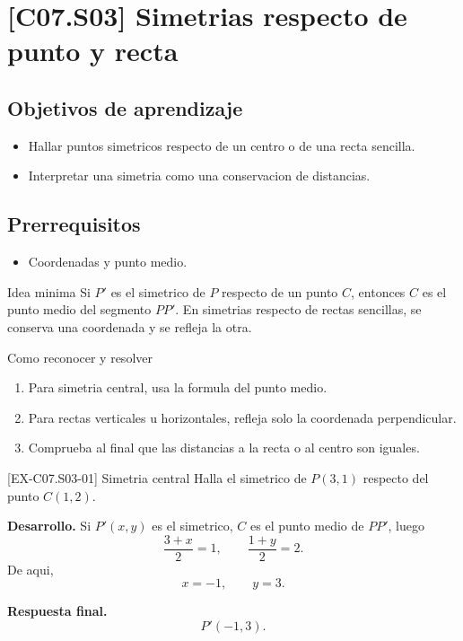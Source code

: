 \section{[C07.S03] Simetrias respecto de punto y recta}

\subsection*{Objetivos de aprendizaje}
\begin{itemize}
  \item Hallar puntos simetricos respecto de un centro o de una recta sencilla.
  \item Interpretar una simetria como una conservacion de distancias.
\end{itemize}

\subsection*{Prerrequisitos}
\begin{itemize}
  \item Coordenadas y punto medio.
\end{itemize}

\begin{theorybox}{Idea minima}
Si \(P'\) es el simetrico de \(P\) respecto de un punto \(C\), entonces \(C\) es el punto medio
del segmento \(PP'\). En simetrias respecto de rectas sencillas, se conserva una coordenada y
se refleja la otra.
\end{theorybox}

\begin{methodbox}{Como reconocer y resolver}
\begin{enumerate}
  \item Para simetria central, usa la formula del punto medio.
  \item Para rectas verticales u horizontales, refleja solo la coordenada perpendicular.
  \item Comprueba al final que las distancias a la recta o al centro son iguales.
\end{enumerate}
\end{methodbox}

\begin{solvedexample}{[EX-C07.S03-01] Simetria central}
Halla el simetrico de \(P(3,1)\) respecto del punto \(C(1,2)\).

\textbf{Desarrollo.} Si \(P'(x,y)\) es el simetrico, \(C\) es el punto medio de \(PP'\), luego
\[
\frac{3+x}{2}=1,
\qquad
\frac{1+y}{2}=2.
\]
De aqui,
\[
x=-1,
\qquad
y=3.
\]

\textbf{Respuesta final.}
\[
P'(-1,3).
\]
\end{solvedexample}

